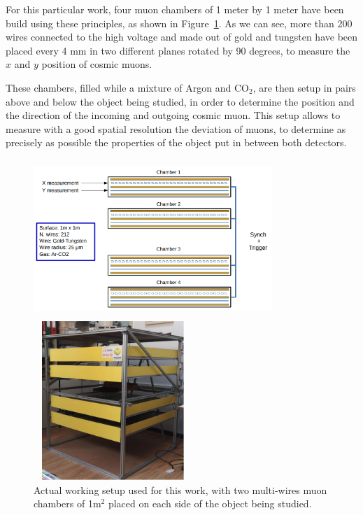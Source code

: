 \documentclass[a4paper, 11pt]{report}
\begin{document}
For this particular work, four muon chambers of 1 meter by 1 meter have been build using these principles, as shown in Figure~\ref{fig:setup}. As we can see, more than 200 wires connected to the high voltage and made out of gold and tungsten have been placed every 4 mm in two different planes rotated by 90 degrees, to measure the $x$ and $y$ position of cosmic muons. 

These chambers, filled while a mixture of Argon and CO$_2$, are then setup in pairs above and below the object being studied, in order to determine the position and the direction of the incoming and outgoing cosmic muon. This setup allows to measure with a good spatial resolution the deviation of muons, to determine as precisely as possible the properties of the object put in between both detectors.

\begin{figure}[htbp]
\centering
\begin{minipage}[b]{.59\textwidth}
\includegraphics[width=9cm, height=6cm]{figs/muonChambers.png}
\end{minipage}\hfill
\begin{minipage}[b]{.39\textwidth}
\includegraphics[width=6cm, height=6cm]{figs/muonChambersPhoto.png}
\end{minipage} \hfill
\caption{Actual working setup used for this work, with two multi-wires muon chambers of 1m$^2$ placed on each side of the object being studied.}
\label{fig:setup}
\end{figure}
\end{document}

